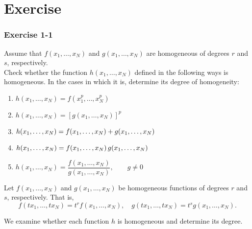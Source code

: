 
\chapter*{Exercise}

\begin{tcolorbox}[breakable]
\subsection*{Exercise 1-1}

Assume that $f(x_1, \dots, x_N)$ and $g(x_1, \dots, x_N)$ are homogeneous
of degrees $r$ and $s$, respectively. \\Check whether the function
$h(x_1, \dots, x_N)$ defined in the following ways is homogeneous.
In the cases in which it is, determine its degree of homogeneity:

\begin{enumerate}
    \item[(i)] $h(x_1, \dots, x_N) = f(x_1^p, \dots, x_N^p)$
    \item[(ii)] $h(x_1, \dots, x_N) = [g(x_1, \dots, x_N)]^p$
    \item[(iii)] $h(x_1, \dots, x_N) \\= f(x_1, \dots, x_N) + g(x_1, \dots, x_N)$
    \item[(iv)] $h(x_1, \dots, x_N) \\= f(x_1, \dots, x_N)\, g(x_1, \dots, x_N)$
    \item[(v)] $h(x_1, \dots, x_N) = \dfrac{f(x_1, \dots, x_N)}{g(x_1, \dots, x_N)}, \qquad g \neq 0$
\end{enumerate}

\end{tcolorbox}


Let $f(x_1,\dots,x_N)$ and $g(x_1,\dots,x_N)$ be homogeneous functions of degrees $r$ and $s$, respectively. That is,
\[
f(tx_1,\dots,tx_N)=t^r f(x_1,\dots,x_N), \quad
g(tx_1,\dots,tx_N)=t^s g(x_1,\dots,x_N).
\]

We examine whether each function $h$ is homogeneous and determine its degree.

